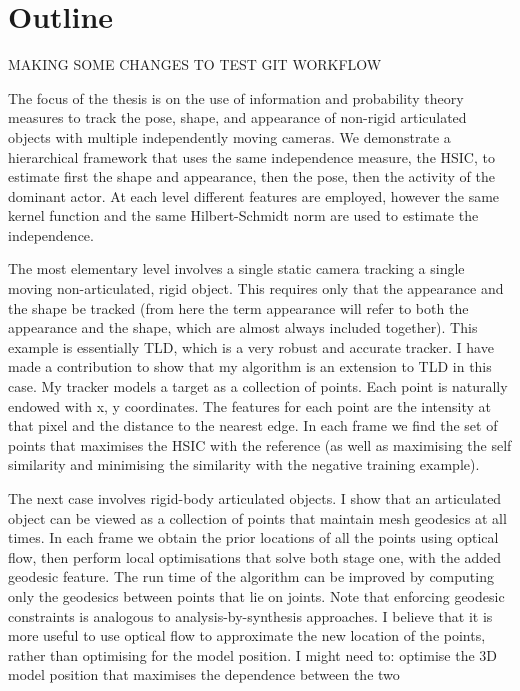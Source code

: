 \chapter{Outline}
\label{outline}

\citet{campbell16}

MAKING SOME CHANGES TO TEST GIT WORKFLOW

The focus of the thesis is on the use of information and probability theory measures to track the pose, shape, and appearance of non-rigid articulated objects with multiple independently moving cameras. We demonstrate a hierarchical framework that uses the same independence measure, the HSIC, to estimate first the shape and appearance, then the pose, then the activity of the dominant actor. At each level different features are employed, however the same kernel function and the same Hilbert-Schmidt norm are used to estimate the independence. 

The most elementary level involves a single static camera tracking a single moving non-articulated, rigid object. This requires only that the appearance and the shape be tracked (from here the term appearance will refer to both the appearance and the shape, which are almost always included together). This example is essentially TLD, which is a very robust and accurate tracker. I have made a contribution to show that my algorithm is an extension to TLD in this case. My tracker models a target as a collection of points. Each point is naturally endowed with x, y coordinates. The features for each point are the intensity at that pixel and the distance to the nearest edge. In each frame we find the set of points that maximises the HSIC with the reference (as well as maximising the self similarity and minimising the similarity with the negative training example).

The next case involves rigid-body articulated objects. I show that an articulated object can be viewed as a collection of points that maintain mesh geodesics at all times. In each frame we obtain the prior locations of all the points using optical flow, then perform local optimisations that solve both stage one, with the added geodesic feature. The run time of the algorithm can be improved by computing only the geodesics between points that lie on joints. Note that enforcing geodesic constraints is analogous to analysis-by-synthesis approaches. I believe that it is more useful to use optical flow to approximate the new location of the points, rather than optimising for the model position. I might need to: optimise the 3D model position that maximises the dependence between the two 

